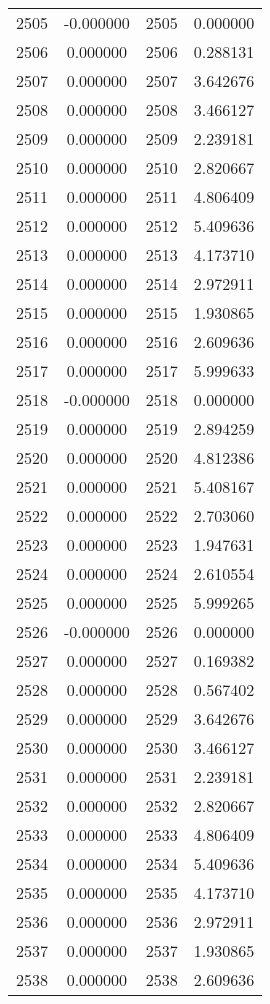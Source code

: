 \documentclass[12pt]{article}
\begin{document}
\begin{longtable}{@{}cccc@{}}
2505 & -0.000000 & 2505 & 0.000000 \\
2506 & 0.000000 & 2506 & 0.288131 \\
2507 & 0.000000 & 2507 & 3.642676 \\
2508 & 0.000000 & 2508 & 3.466127 \\
2509 & 0.000000 & 2509 & 2.239181 \\
2510 & 0.000000 & 2510 & 2.820667 \\
2511 & 0.000000 & 2511 & 4.806409 \\
2512 & 0.000000 & 2512 & 5.409636 \\
2513 & 0.000000 & 2513 & 4.173710 \\
2514 & 0.000000 & 2514 & 2.972911 \\
2515 & 0.000000 & 2515 & 1.930865 \\
2516 & 0.000000 & 2516 & 2.609636 \\
2517 & 0.000000 & 2517 & 5.999633 \\
2518 & -0.000000 & 2518 & 0.000000 \\
2519 & 0.000000 & 2519 & 2.894259 \\
2520 & 0.000000 & 2520 & 4.812386 \\
2521 & 0.000000 & 2521 & 5.408167 \\
2522 & 0.000000 & 2522 & 2.703060 \\
2523 & 0.000000 & 2523 & 1.947631 \\
2524 & 0.000000 & 2524 & 2.610554 \\
2525 & 0.000000 & 2525 & 5.999265 \\
2526 & -0.000000 & 2526 & 0.000000 \\
2527 & 0.000000 & 2527 & 0.169382 \\
2528 & 0.000000 & 2528 & 0.567402 \\
2529 & 0.000000 & 2529 & 3.642676 \\
2530 & 0.000000 & 2530 & 3.466127 \\
2531 & 0.000000 & 2531 & 2.239181 \\
2532 & 0.000000 & 2532 & 2.820667 \\
2533 & 0.000000 & 2533 & 4.806409 \\
2534 & 0.000000 & 2534 & 5.409636 \\
2535 & 0.000000 & 2535 & 4.173710 \\
2536 & 0.000000 & 2536 & 2.972911 \\
2537 & 0.000000 & 2537 & 1.930865 \\
2538 & 0.000000 & 2538 & 2.609636 \\

\end{longtable}
\end{document}
